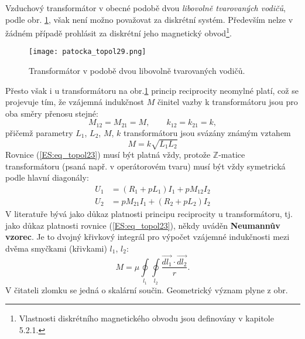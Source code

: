         Vzduchový transformátor v obecné podobě dvou \emph{libovolně tvarovaných vodičů}, podle 
        obr. \ref{es:fig_patocka_topol29}, však není možno považovat za diskrétní systém. Především 
        nelze v žádném případě prohlásit za diskrétní jeho magnetický obvod\footnote{Vlastnosti 
        diskrétního magnetického obvodu jsou definovány v kapitole 5.2.1.}.
        \begin{figure}[ht!]
          \centering  
          \texttt{[image: patocka\_topol29.png]}
          \caption{Transformátor v podobě dvou libovolně tvarovaných vodičů.           
            \cite[s.~63]{Patocka4}} 
          \label{es:fig_patocka_topol29}
        \end{figure}        
        Přesto však i u transformátoru na obr.\ref{es:fig_patocka_topol29} princip reciprocity 
        neomylné platí, což se projevuje tím, že vzájemná indukčnost \(M\) činitel vazby k 
        transformátoru jsou pro oba směry přenosu stejné:
        \begin{equation}\label{ES:eq_topol23}
          M_{12} = M_{21} = M, \qquad k_{12} = k_{21} = k,
        \end{equation} 
        přičemž parametry \(L_1\), \(L_2\), \(M\), \(k\) transformátoru jsou svázány známým vztahem
        \begin{equation}\label{ES:eq_topol24}
          M = k\sqrt{L_1L_2}
        \end{equation} 
        Rovnice (\ref{ES:eq_topol23}) musí být platná vždy, protože \(\mathbb{Z}\)-matice 
        transformátoru (psaná např. v operátorovém tvaru) musí být vždy symetrická podle hlavní 
        diagonály:
        \begin{align}\label{ES:eq_topol25}
          U_1 &= (R_1+pL_1)I_1 + pM_{12}I_2  \nonumber \\
          U_2 &= pM_{21}I_1 + (R_2+pL_2)I_2  
        \end{align} 
        V	literatuře bývá jako důkaz platnosti principu reciprocity u transformátoru, tj. jako 
        důkaz platnosti rovnice (\ref{ES:eq_topol23}), někdy uváděn \textbf{Neumannův vzorec}. Je 
        to dvojný křivkový integrál pro výpočet vzájemné indukčnosti mezi dvěma smyčkami (křivkami) 
        \(l_1\), \(l_2\):
        \begin{equation}\label{ES:eq_topol26}
          M = \mu\oint\limits_{l_1}\oint\limits_{l_2}\frac{\vec{dl_1}\cdot\vec{dl_2}}{r}.
        \end{equation}
        V	čitateli zlomku se jedná o skalární součin. Geometrický význam plyne z obr. 

